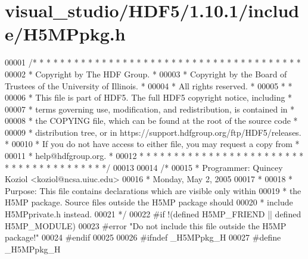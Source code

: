 \hypertarget{visual__studio_2_h_d_f5_21_810_81_2include_2_h5_m_ppkg_8h_source}{}\section{visual\+\_\+studio/\+H\+D\+F5/1.10.1/include/\+H5\+M\+Ppkg.h}
\label{visual__studio_2_h_d_f5_21_810_81_2include_2_h5_m_ppkg_8h_source}

\begin{DoxyCode}
00001 \textcolor{comment}{/* * * * * * * * * * * * * * * * * * * * * * * * * * * * * * * * * * * * * * *}
00002 \textcolor{comment}{ * Copyright by The HDF Group.                                               *}
00003 \textcolor{comment}{ * Copyright by the Board of Trustees of the University of Illinois.         *}
00004 \textcolor{comment}{ * All rights reserved.                                                      *}
00005 \textcolor{comment}{ *                                                                           *}
00006 \textcolor{comment}{ * This file is part of HDF5.  The full HDF5 copyright notice, including     *}
00007 \textcolor{comment}{ * terms governing use, modification, and redistribution, is contained in    *}
00008 \textcolor{comment}{ * the COPYING file, which can be found at the root of the source code       *}
00009 \textcolor{comment}{ * distribution tree, or in https://support.hdfgroup.org/ftp/HDF5/releases.  *}
00010 \textcolor{comment}{ * If you do not have access to either file, you may request a copy from     *}
00011 \textcolor{comment}{ * help@hdfgroup.org.                                                        *}
00012 \textcolor{comment}{ * * * * * * * * * * * * * * * * * * * * * * * * * * * * * * * * * * * * * * */}
00013 
00014 \textcolor{comment}{/*}
00015 \textcolor{comment}{ * Programmer:  Quincey Koziol <koziol@ncsa.uiuc.edu>}
00016 \textcolor{comment}{ *      Monday, May  2, 2005}
00017 \textcolor{comment}{ *}
00018 \textcolor{comment}{ * Purpose: This file contains declarations which are visible only within}
00019 \textcolor{comment}{ *      the H5MP package.  Source files outside the H5MP package should}
00020 \textcolor{comment}{ *      include H5MPprivate.h instead.}
00021 \textcolor{comment}{ */}
00022 \textcolor{preprocessor}{#if !(defined H5MP\_FRIEND || defined H5MP\_MODULE)}
00023 \textcolor{preprocessor}{#error "Do not include this file outside the H5MP package!"}
00024 \textcolor{preprocessor}{#endif}
00025 
00026 \textcolor{preprocessor}{#ifndef \_H5MPpkg\_H}
00027 \textcolor{preprocessor}{#define \_H5MPpkg\_H}

\end{DoxyCode}
